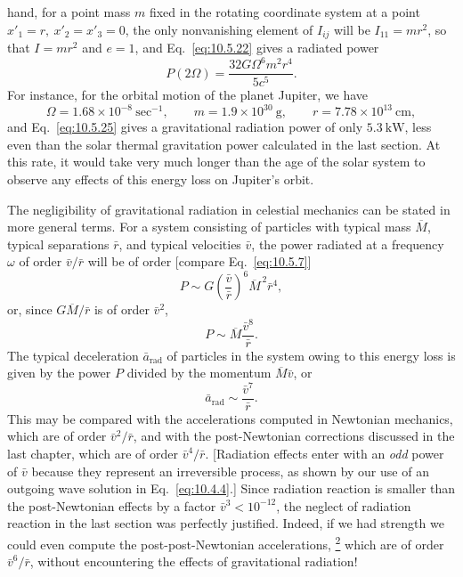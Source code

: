 hand, for a point mass \(m\) fixed in the rotating coordinate system at a
point \(x'_1=r,\ x'_2=x'_3=0\), the only nonvanishing element of \(I_{ij}\)
will be \(I_{11}=mr^2\), so that \(I=mr^2\) and \(e=1\), and
Eq.~\eqref{eq:10.5.22} gives a radiated power
\begin{equation}
  P(2\Omega)
  =
  \frac{32G\Omega^6m^2r^4}{5c^5}.
  \tag{10.5.25}\label{eq:10.5.25}
\end{equation}
For instance, for the orbital motion of the planet Jupiter, we have
\[
  \Omega=1.68\times10^{-8}\ \mathrm{sec}^{-1},
  \qquad
  m=1.9\times10^{30}\ \mathrm{g},
  \qquad
  r=7.78\times10^{13}\ \mathrm{cm},
\]
and Eq.~\eqref{eq:10.5.25} gives a gravitational radiation power of only
\(5.3\ \mathrm{kW}\), less even than the solar thermal gravitation power
calculated in the last section. At this rate, it would take very much longer
than the age of the solar system to observe any effects of this energy loss
on Jupiter's orbit.

The negligibility of gravitational radiation in celestial mechanics can be
stated in more general terms. For a system consisting of particles with
typical mass \(\overline M\), typical separations \(\bar r\), and typical
velocities \(\bar v\), the power radiated at a frequency \(\omega\) of order
\(\bar v/\bar r\) will be of order [compare Eq.~\eqref{eq:10.5.7}]
\[
  P\sim
  G\left(\frac{\bar v}{\bar r}\right)^6
  \overline M^{\,2}\bar r^4,
\]
or, since \(G\overline M/\bar r\) is of order \(\bar v^2\),
\[
  P\sim\overline M\frac{\bar v^8}{\bar r}.
\]
The typical deceleration \(\bar a_{\mathrm{rad}}\) of particles in the system
owing to this energy loss is given by the power \(P\) divided by the momentum
\(\overline M\bar v\), or
\[
  \bar a_{\mathrm{rad}}\sim\frac{\bar v^7}{\bar r}.
\]
This may be compared with the accelerations computed in Newtonian mechanics,
which are of order \(\bar v^2/\bar r\), and with the post-Newtonian
corrections discussed in the last chapter, which are of order
\(\bar v^4/\bar r\). [Radiation effects enter with an \emph{odd} power of
\(\bar v\) because they represent an irreversible process, as shown by our
use of an outgoing wave solution in Eq.~\eqref{eq:10.4.4}.] Since radiation
reaction is smaller than the post-Newtonian effects by a factor
\(\bar v^3<10^{-12}\), the neglect of radiation reaction in the last section
was perfectly justified. Indeed, if we had strength we could even compute
the post-post-Newtonian accelerations,%
\hyperref[ch10-ref-2]{\textsuperscript{2}}
which are of order \(\bar v^6/\bar r\), without encountering the effects of
gravitational radiation!

